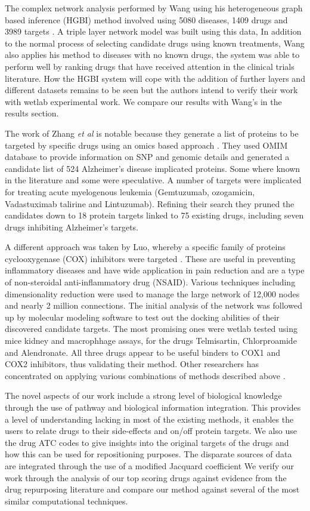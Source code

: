 \documentclass[preprint,12pt]{elsarticle}
\begin{document}
The complex network analysis performed by Wang using his heterogeneous graph based inference (HGBI) method involved using 5080 diseases, 1409 drugs and 3989 targets \cite{Wang2014}. A triple layer network model was built using this data,  In addition to the normal process of selecting candidate drugs using known treatments, Wang also applies his method to diseases with no known drugs, the system was able to perform well by ranking drugs that have received attention in the clinical trials literature. How the HGBI system  will cope with the addition of further layers and different datasets remains to be seen but the authors intend to verify their work with wetlab experimental work. We compare our results with Wang's in the results section.

The work of Zhang {\it et al} is notable because they generate a list of proteins to be targeted by specific drugs using an omics based approach \cite{Zhang2016}. They used OMIM database to provide information on SNP and genomic details and generated a candidate list of 524 Alzheimer's disease implicated proteins. Some where known in the literature and some were speculative. A number of targets were implicated for treating acute myelogenous leukemia (Gemtuzumab, ozogamicin, Vadastuximab talirine and Lintuzumab). Refining their search they pruned the candidates down to 18 protein targets linked to 75 existing drugs, including seven  drugs inhibiting Alzheimer's targets.

A different approach was taken by Luo, whereby a specific family of proteins cyclooxygenase (COX) inhibitors were targeted \cite{Luo2016,Luo2017}. These are useful in preventing inflammatory diseases and have wide application in pain reduction and are a type of non-steroidal anti-inflammatory drug (NSAID). Various techniques including dimensionality reduction were used to  manage the large network of 12,000 nodes and nearly 2 million connections. The initial analysis of the network was followed up by molecular modeling software to test out the docking abilities of their discovered candidate targets. The most promising ones were wetlab tested using mice kidney and macrophhage assays, for the drugs Telmisartin, Chlorproamide and Alendronate. All three drugs appear to be useful binders to COX1 and COX2 inhibitors, thus validating their method. Other researchers has concentrated on applying various combinations of methods described above \cite{Ye2014, XWang2013, Liu2016, TLiu2015,ChaoWu2013}.

The novel aspects of our work include a strong level of biological knowledge  through the use of pathway and biological information  integration. This provides a level of understanding lacking in most of the existing methods, it enables the users to relate drugs to their side-effects and on/off protein targets. We also use the drug ATC codes to give insights into the  original targets of the drugs and how this can be used for repositioning purposes. The disparate sources of data are integrated through the use of a modified Jacquard coefficient We verify our work through the analysis of our top scoring drugs against evidence from the drug repurposing literature and compare our method against several of the most similar computational techniques. 
\end{document}
